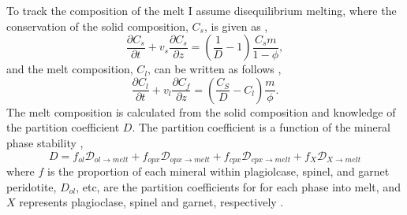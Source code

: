 To track the composition of the melt I assume disequilibrium melting, where the conservation of the solid composition, $C_{s}$, is given as \citep{spiegelman-1996},
\begin{equation}
\frac{\partial C_{s}}{\partial t} + v_{s}\frac{\partial C_{s}}{\partial z} = \left(\frac{1}{D} - 1\right) \frac{C_{s}m}{1-\phi},
\label{eq:solid-composition}
\end{equation}
and the melt composition, $C_{l}$, can be written as follows \citep{spiegelman-1996},
\begin{equation}
\frac{\partial C_{l}}{\partial t} + v_{l}\frac{\partial C_{f}}{\partial z} = \left(\frac{C_{S}}{D} - C_{l}\right)\frac{m}{\phi}.
\label{eq:melt-composition}
\end{equation}
The melt composition is calculated from the solid composition and knowledge of the partition coefficient $D$. The partition coefficient is a function of the mineral phase stability \citep{mckenzie-1991},
\begin{equation}
D = f_{ol}\mathcal{D}_{ol\rightarrow melt} + f_{opx}\mathcal{D}_{opx\rightarrow melt} + f_{cpx}\mathcal{D}_{cpx\rightarrow melt} + f_{X}\mathcal{D}_{X\rightarrow melt}
\label{eq:onions}
\end{equation}
where $f$ is the proportion of each mineral within plagiolcase, spinel, and garnet peridotite, $D_{ol}$, etc, are the partition coefficients for for each phase into melt, and $X$ represents plagioclase, spinel and garnet, respectively \citep[e.g.][]{armitage-etal-g3-2011,armitage-etal-g3-2018}.

